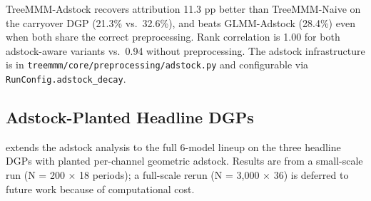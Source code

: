 \documentclass[review,12pt]{elsarticle}
\begin{document}
\begin{table}[ht]
\centering
\caption{Adstock DGP (500$\times$24): does adstock-aware preprocessing recover
         the planted carryover? True \texttt{rep\_visits} share = 0.42.}
\label{tab:adstock}
\end{table}

TreeMMM-Adstock recovers attribution 11.3 pp better than TreeMMM-Naive on the
carryover DGP (21.3\% vs.\ 32.6\%), and beats GLMM-Adstock (28.4\%) even when
both share the correct preprocessing. Rank correlation is 1.00 for both
adstock-aware variants vs.\ 0.94 without preprocessing. The adstock
infrastructure is in \texttt{treemmm/core/preprocessing/adstock.py} and
configurable via \texttt{RunConfig.adstock\_decay}.

\subsection{Adstock-Planted Headline DGPs}
\label{sec:results:adstock_headline}

 extends the adstock analysis to the full 6-model
lineup on the three headline DGPs with planted per-channel geometric adstock.
Results are from a small-scale run (N = 200 $\times$ 18 periods); a full-scale
rerun (N = 3,000 $\times$ 36) is deferred to future work because of
computational cost.
\end{document}
